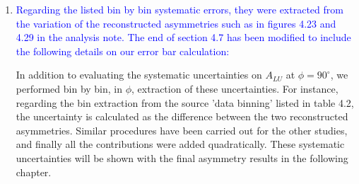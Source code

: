 \begin{enumerate}
\begin{enumerate}
\end{enumerate}

\item \textcolor{blue}{Regarding the listed bin by bin systematic errors, they 
   were extracted from the variation of the reconstructed asymmetries such as 
in figures 4.23 and 4.29 in the analysis note. The end of section 4.7 has been 
modified to include the following details on our error bar calculation:}

In addition to evaluating the systematic uncertainties on $A_{LU}$ at $\phi = 
90^{\circ}$, we performed bin by bin, in $\phi$, extraction of these 
uncertainties. For instance, regarding the bin extraction from the source 'data 
binning' listed in table 4.2, the uncertainty is calculated as the difference 
between the two reconstructed asymmetries.  Similar procedures have been 
carried out for the other studies, and finally all the contributions were added 
quadratically. These systematic uncertainties will be shown with the final 
asymmetry results in the following chapter.

\end{enumerate}

